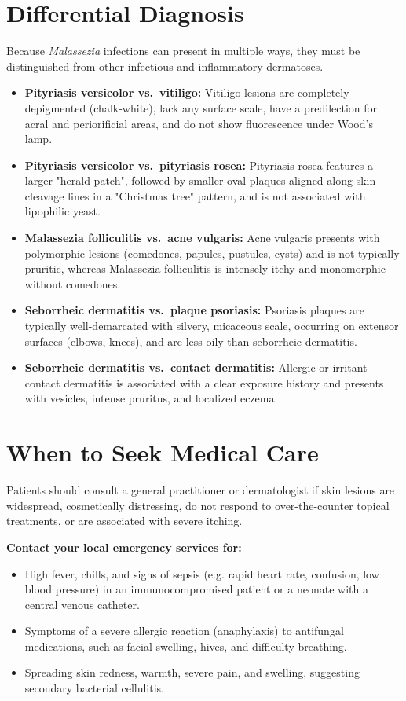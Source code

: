 \section*{Differential Diagnosis}
Because \textit{Malassezia} infections can present in multiple ways, they must be distinguished from other infectious and inflammatory dermatoses.
\begin{itemize}
    \item \textbf{Pityriasis versicolor vs.\ vitiligo:} Vitiligo lesions are completely depigmented (chalk-white), lack any surface scale, have a predilection for acral and periorificial areas, and do not show fluorescence under Wood's lamp.
    \item \textbf{Pityriasis versicolor vs.\ pityriasis rosea:} Pityriasis rosea features a larger "herald patch", followed by smaller oval plaques aligned along skin cleavage lines in a "Christmas tree" pattern, and is not associated with lipophilic yeast.
    \item \textbf{Malassezia folliculitis vs.\ acne vulgaris:} Acne vulgaris presents with polymorphic lesions (comedones, papules, pustules, cysts) and is not typically pruritic, whereas Malassezia folliculitis is intensely itchy and monomorphic without comedones.
    \item \textbf{Seborrheic dermatitis vs.\ plaque psoriasis:} Psoriasis plaques are typically well-demarcated with silvery, micaceous scale, occurring on extensor surfaces (elbows, knees), and are less oily than seborrheic dermatitis.
    \item \textbf{Seborrheic dermatitis vs.\ contact dermatitis:} Allergic or irritant contact dermatitis is associated with a clear exposure history and presents with vesicles, intense pruritus, and localized eczema.
\end{itemize}

\section*{When to Seek Medical Care}
Patients should consult a general practitioner or dermatologist if skin lesions are widespread, cosmetically distressing, do not respond to over-the-counter topical treatments, or are associated with severe itching.

\textbf{Contact your local emergency services for:}
\begin{itemize}
    \item High fever, chills, and signs of sepsis (e.g. rapid heart rate, confusion, low blood pressure) in an immunocompromised patient or a neonate with a central venous catheter.
    \item Symptoms of a severe allergic reaction (anaphylaxis) to antifungal medications, such as facial swelling, hives, and difficulty breathing.
    \item Spreading skin redness, warmth, severe pain, and swelling, suggesting secondary bacterial cellulitis.
\end{itemize}

